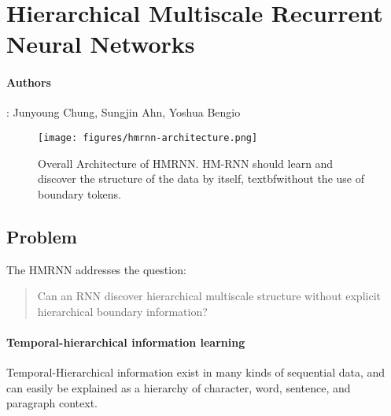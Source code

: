 \section{Hierarchical Multiscale Recurrent Neural Networks}
\paragraph{Authors}: Junyoung Chung, Sungjin Ahn, Yoshua Bengio \cite{chung_hierarchical_2017} \\

\begin{figure}[ht!]
    \begin{small}
        \begin{center}
            \texttt{[image: figures/hmrnn-architecture.png]}
        \end{center}
        \caption{Overall Architecture of HMRNN. 
        HM-RNN should learn and discover the structure of the data by itself, textbf{without the use of boundary tokens}. 
        }
        \label{fig:hmrnn-architecture}
    \end{small}
\end{figure}


\subsection{Problem}
The HMRNN addresses the question:
\begin{quote}
    Can an RNN discover hierarchical multiscale structure without explicit hierarchical boundary information?
\end{quote}


\paragraph{Temporal-hierarchical information learning}
Temporal-Hierarchical information exist in many kinds of sequential data, and can easily be explained as a hierarchy of character, word, sentence, and paragraph context. 

